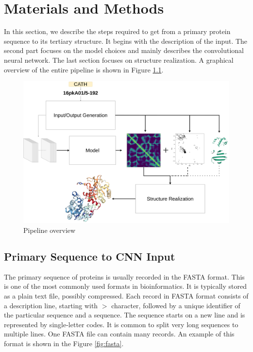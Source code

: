 \chapter{Materials and Methods}

In this section, we describe the steps required to get from a primary protein sequence to its tertiary structure.
It begins with the description of the input. 
The second part focuses on the model choices and mainly describes the convolutional neural network. 
The last section focuses on structure realization. 
A graphical overview of the entire pipeline is shown in Figure \ref{fig:project_pipeline}. 

\begin{figure}[ht]
    \centering
    \includegraphics[width=\linewidth]{imgs_tomas/Project_pipeline_small.png}
    \caption{Pipeline overview}
    \label{fig:project_pipeline}
\end{figure}

\section{Primary Sequence to CNN Input}


The primary sequence of proteins is usually recorded in the FASTA format.
This is one of the most commonly used formats in bioinformatics.
It is typically stored as a plain text file, possibly compressed. 
Each record in FASTA format consists of a description line, starting with $>$ character, followed by a unique identifier of the particular sequence and a sequence.
The sequence starts on a new line and is represented by single-letter codes.
It is common to split very long sequences to multiple lines.
One FASTA file can contain many records.
An example of this format is shown in the Figure \ref{fig:fasta}.

